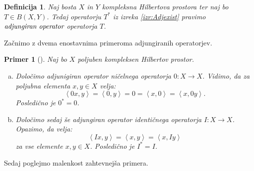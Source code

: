 \documentclass[12pt,a4paper,oneside,fleqn,openany]{book}
\newtheorem{definicija}[izrek]{Definicija}
\newtheorem{primer*}[izrek]{Primer}
\newenvironment{primer}[1][]{\begin{primer*}[#1]\renewcommand*{\qedsymbol}{$\diamondsuit$}\pushQED{\qed}}{\popQED\end{primer*}}
\newcommand{\pojem}[1]{\ensuremath{\emph{#1}}}
\newcommand{\Sp}[2]{\ensuremath{\left<#1, #2\right>}}
\newcommand{\map}[3]{\ensuremath{{#1}:{#2}\rightarrow{#3}}}
\begin{document}
\begin{definicija}
	\label{def:adjop}
	Naj bosta $X$ in $Y$ kompleksna Hilbertova prostora ter naj bo $T\in B(X, Y)$. Tedaj operatorju $T^*$ iz izreka \ref{izr:Adjexist} pravimo \pojem{adjungiran operator} operatorja $T$.
\end{definicija}
Začnimo z dvema enostavnima primeroma adjungiranih operatorjev. 
\begin{primer}
	\label{prim:trivadj}
	Naj bo $X$ poljuben kompleksen Hilbertov prostor. 
	\begin{enumerate}[a)]
		\item Določimo adjunigiran operator ničelnega operatorja $\map{0}{X}{X}$. Vidimo, da za poljubna elementa $x, y\in X$ velja: $$\Sp{0x}{y} = \Sp{0}{y} = 0 = \Sp{x}{0} = \Sp{x}{0y}.$$ Posledično je $0^* = 0$.
		\item Določimo sedaj še adjungiran operator identičnega operatorja $\map{I}{X}{X}$. Opazimo, da velja: $$\Sp{Ix}{y} = \Sp{x}{y} = \Sp{x}{Iy}$$ za vse elemente $x, y\in X$. Posledično je $I^* = I$.
	\end{enumerate}
\end{primer}
Sedaj poglejmo malenkost zahtevnejša primera.
\end{document}
